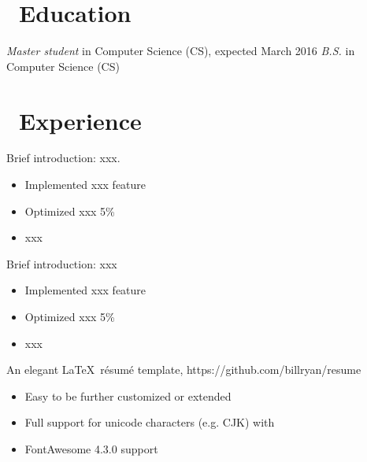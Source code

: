 \documentclass{resume}
\begin{document}



\section{\faGraduationCap\ Education}
\textit{Master student} in Computer Science (CS), expected March 2016
\textit{B.S.} in Computer Science (CS)

\section{\faUsers\ Experience}
Brief introduction: xxx.
\begin{itemize}
  \item Implemented xxx feature
  \item Optimized xxx 5\%
  \item xxx
\end{itemize}

Brief introduction: xxx
\begin{itemize}
  \item Implemented xxx feature
  \item Optimized xxx 5\%
  \item xxx
\end{itemize}

An elegant \LaTeX\ résumé template, https://github.com/billryan/resume
\begin{itemize}
  \item Easy to be further customized or extended
  \item Full support for unicode characters (e.g. CJK) with \XeLaTeX\
  \item FontAwesome 4.3.0 support
\end{itemize}
\end{document}
